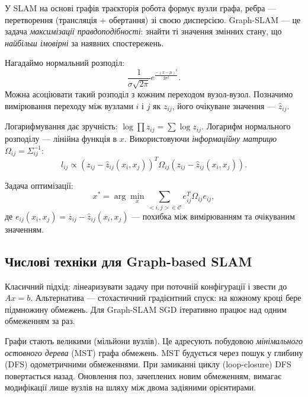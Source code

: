 У SLAM на основі графів траєкторія робота формує вузли графа, ребра — перетворення (трансляція + обертання) зі своєю дисперсією. Graph-SLAM — це задача \emph{максимізації правдоподібності}: знайти ті значення змінних стану, що \emph{найбільш імовірні} за наявних спостережень.

Нагадаймо нормальний розподіл:
\begin{equation}
\frac{1}{\sigma\sqrt{2\pi}}e^{\frac{-(x-\mu)^2}{2\sigma^2}}.
\label{eq:pdf_typical}
\end{equation}
Можна асоціювати такий розподіл з кожним переходом вузол-вузол. Позначимо вимірювання переходу між вузлами $i$ і $j$ як $z_{ij}$, його очікуване значення — $\hat{z}_{ij}$.

Логарифмування дає зручність: $\log \prod{z_{ij}} = \sum{\log z_{ij}}$. Логарифм нормального розподілу — лінійна функція в $x$. Використовуючи \emph{інформаційну матрицю} $\Omega_{ij}=\Sigma_{ij}^{-1}$:
\begin{equation}
l_{ij} \propto (z_{ij}-\hat{z}_{ij}(x_i,x_j))^T \Omega_{ij} (z_{ij}-\hat{z}_{ij}(x_i,x_j)).
\end{equation}

Задача оптимізації:
\begin{equation}\label{eq:slamEM}
x^* = \arg \min_{x}\sum_{<i,j>\in \mathcal{C}} e_{ij}^T \Omega_{ij} e_{ij},
\end{equation}
де $e_{ij}(x_i,x_j)=z_{ij}-\hat{z}_{ij}(x_i,x_j)$ — похибка між вимірюванням та очікуваним значенням.

\subsection{Числові техніки для Graph-based SLAM}
Класичний підхід: лінеаризувати задачу при поточній конфігурації і звести до $Ax=b$. Альтернатива — стохастичний градієнтний спуск: на кожному кроці бере підмножину обмежень. Для Graph-SLAM SGD ітеративно працює над одним обмеженням за раз.

Графи стають великими (мільйони вузлів). Це адресують побудовою \emph{мінімального остовного дерева} (MST) графа обмежень. MST будується через пошук у глибину (DFS) одометричними обмеженнями. При замиканні циклу (loop-closure) DFS повертається назад. Оновлення поз, зачеплених новим обмеженням, вимагає модифікації лише вузлів на шляху між двома задіяними орієнтирами.


